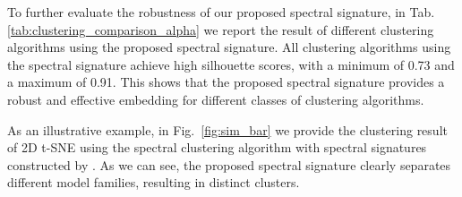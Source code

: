 To further evaluate the robustness of our proposed spectral signature, in Tab. \ref{tab:clustering_comparison_alpha} we report the result of different clustering algorithms using the proposed spectral signature. All clustering algorithms using the spectral signature achieve high silhouette scores, with a minimum of 0.73 and a maximum of 0.91. This shows that the proposed spectral signature provides a robust and effective embedding for different classes of clustering algorithms. 


As an illustrative example, in Fig.~\ref{fig:sim_bar} we provide the clustering result of 2D t-SNE using the spectral clustering algorithm with spectral signatures constructed by \ALPHAHILL. As we can see, the proposed spectral signature clearly separates different model families, resulting in distinct clusters.